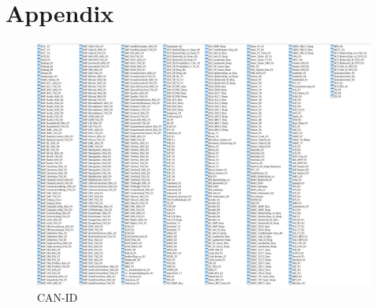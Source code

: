 \chapter{Appendix}

\begin{figure}[hbt!]
    \centering
    \includegraphics[width=1.0\textwidth]{gfx/DBC_table.png}
    \caption{CAN-ID}
    \label{fig:can_idtable}
\end{figure}

